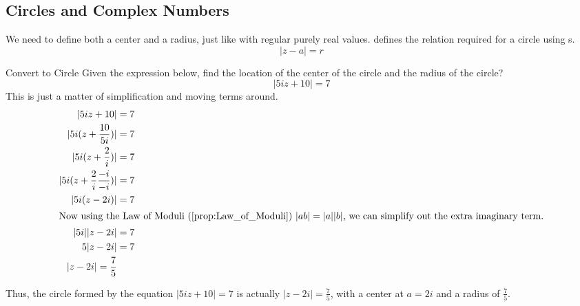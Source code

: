\subsection{Circles and Complex Numbers}\label{subsec:Circles_Complex_Numbers}
We need to define both a center and a radius, just like with regular purely real values.
 defines the relation required for a circle using s.
\begin{equation}\label{eq:Circles_Complex_Numbers}
  \lvert z - a \rvert = r
\end{equation}

\begin{example}{Convert to Circle}
  Given the expression below, find the location of the center of the circle and the radius of the circle?
  \begin{equation*}
    \lvert 5 iz + 10 \rvert = 7
  \end{equation*}
  \tcblower{}
  This is just a matter of simplification and moving terms around.
  \begin{align*}
    \lvert 5 iz + 10 \rvert &= 7 \\
    \lvert 5i (z + \frac{10}{5i}) \rvert &= 7 \\
    \lvert 5i (z + \frac{2}{i}) \rvert &= 7 \\
    \lvert 5i (z + \frac{2}{i} \frac{-i}{-i}) \rvert &= 7 \\
    \lvert 5i (z - 2i) \rvert &= 7 \\
    \intertext{Now using the Law of Moduli (\Cref{prop:Law_of_Moduli}) $\lvert a b \rvert = \lvert a \rvert \lvert b \rvert$, we can simplify out the extra imaginary term.}
    \lvert 5i \rvert \lvert z-2i \rvert &= 7 \\
    5 \lvert z - 2i \rvert &= 7 \\
    \lvert z - 2i \rvert = \frac{7}{5}
  \end{align*}

  Thus, the circle formed by the equation $\lvert 5 iz + 10 \rvert = 7$ is actually $\lvert z - 2i \rvert = \frac{7}{5}$, with a center at $a = 2i$ and a radius of $\frac{7}{5}$.
\end{example}


